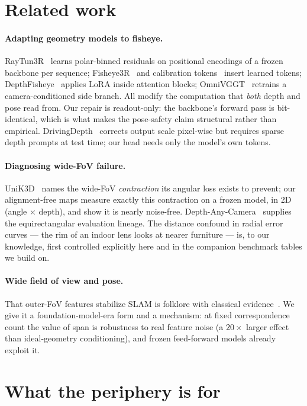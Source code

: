 \documentclass{article}
\begin{document}
\section{Related work}
\label{sec:related}

\paragraph{Adapting geometry models to fisheye.}
RayTun3R~\cite{raytun3r} learns polar-binned residuals on positional
encodings of a frozen backbone per sequence; Fisheye3R~\cite{fisheye3r} and
calibration tokens~\cite{caltokens} insert learned tokens;
DepthFisheye~\cite{depthfisheye} applies LoRA inside attention blocks;
OmniVGGT~\cite{omnivggt} retrains a camera-conditioned side branch. All
modify the computation that \emph{both} depth and pose read from. Our repair
is readout-only: the backbone's forward pass is bit-identical, which is what
makes the pose-safety claim structural rather than empirical.
DrivingDepth~\cite{drivingdepth} corrects output scale pixel-wise but
requires sparse depth prompts at test time; our head needs only the model's
own tokens.

\paragraph{Diagnosing wide-FoV failure.}
UniK3D~\cite{unik3d} names the wide-FoV \emph{contraction} its angular loss
exists to prevent; our alignment-free maps measure exactly this contraction
on a frozen model, in 2D (angle $\times$ depth), and show it is nearly
noise-free. Depth-Any-Camera~\cite{dac} supplies the equirectangular
evaluation lineage. The distance confound in radial error curves --- the rim
of an indoor lens looks at nearer furniture --- is, to our knowledge, first
controlled explicitly here and in the companion benchmark tables we build on.

\paragraph{Wide field of view and pose.}
That outer-FoV features stabilize SLAM is folklore with classical
evidence~\cite{lfvislam}. We give it a foundation-model-era form and a
mechanism: at fixed correspondence count the value of span is robustness to
real feature noise (a $20\times$ larger effect than ideal-geometry
conditioning), and frozen feed-forward models already exploit it.

\section{What the periphery is for}
\label{sec:periphery}
\end{document}
